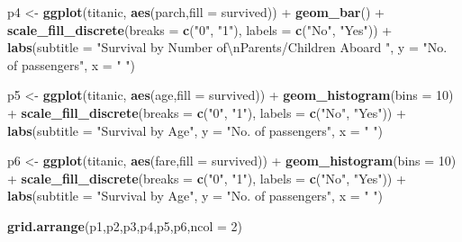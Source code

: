 \documentclass[12,]{article}
\newenvironment{Shaded}{\begin{snugshade}}{\end{snugshade}}
\newcommand{\KeywordTok}[1]{\textcolor[rgb]{0.13,0.29,0.53}{\textbf{{#1}}}}
\newcommand{\DataTypeTok}[1]{\textcolor[rgb]{0.13,0.29,0.53}{{#1}}}
\newcommand{\DecValTok}[1]{\textcolor[rgb]{0.00,0.00,0.81}{{#1}}}
\newcommand{\CharTok}[1]{\textcolor[rgb]{0.31,0.60,0.02}{{#1}}}
\newcommand{\StringTok}[1]{\textcolor[rgb]{0.31,0.60,0.02}{{#1}}}
\newcommand{\NormalTok}[1]{{#1}}
\begin{document}
\begin{Shaded}
\begin{Highlighting}[]
\NormalTok{p4 <-}\StringTok{ }\KeywordTok{ggplot}\NormalTok{(titanic, }\KeywordTok{aes}\NormalTok{(parch,}\DataTypeTok{fill =} \NormalTok{survived)) +}\StringTok{ }
\StringTok{    }\KeywordTok{geom_bar}\NormalTok{() +}\StringTok{ }\KeywordTok{scale_fill_discrete}\NormalTok{(}\DataTypeTok{breaks =} \KeywordTok{c}\NormalTok{(}\StringTok{"0"}\NormalTok{, }\StringTok{"1"}\NormalTok{), }\DataTypeTok{labels =} \KeywordTok{c}\NormalTok{(}\StringTok{"No"}\NormalTok{, }\StringTok{"Yes"}\NormalTok{)) +}\StringTok{ }
\StringTok{    }\KeywordTok{labs}\NormalTok{(}\DataTypeTok{subtitle =} \StringTok{"Survival by Number of}\CharTok{\textbackslash{}n}\StringTok{Parents/Children Aboard "}\NormalTok{, }
         \DataTypeTok{y =} \StringTok{"No. of passengers"}\NormalTok{, }\DataTypeTok{x =} \StringTok{" "}\NormalTok{)}

\NormalTok{p5 <-}\StringTok{ }\KeywordTok{ggplot}\NormalTok{(titanic, }\KeywordTok{aes}\NormalTok{(age,}\DataTypeTok{fill =} \NormalTok{survived)) +}\StringTok{ }\KeywordTok{geom_histogram}\NormalTok{(}\DataTypeTok{bins =} \DecValTok{10}\NormalTok{) +}
\StringTok{    }\KeywordTok{scale_fill_discrete}\NormalTok{(}\DataTypeTok{breaks =} \KeywordTok{c}\NormalTok{(}\StringTok{"0"}\NormalTok{, }\StringTok{"1"}\NormalTok{), }\DataTypeTok{labels =} \KeywordTok{c}\NormalTok{(}\StringTok{"No"}\NormalTok{, }\StringTok{"Yes"}\NormalTok{)) +}
\StringTok{    }\KeywordTok{labs}\NormalTok{(}\DataTypeTok{subtitle =} \StringTok{"Survival by Age"}\NormalTok{, }\DataTypeTok{y =} \StringTok{"No. of passengers"}\NormalTok{, }\DataTypeTok{x =} \StringTok{" "}\NormalTok{)}

\NormalTok{p6 <-}\StringTok{ }\KeywordTok{ggplot}\NormalTok{(titanic, }\KeywordTok{aes}\NormalTok{(fare,}\DataTypeTok{fill =} \NormalTok{survived)) +}\StringTok{ }\KeywordTok{geom_histogram}\NormalTok{(}\DataTypeTok{bins =} \DecValTok{10}\NormalTok{) +}
\StringTok{    }\KeywordTok{scale_fill_discrete}\NormalTok{(}\DataTypeTok{breaks =} \KeywordTok{c}\NormalTok{(}\StringTok{"0"}\NormalTok{, }\StringTok{"1"}\NormalTok{), }\DataTypeTok{labels =} \KeywordTok{c}\NormalTok{(}\StringTok{"No"}\NormalTok{, }\StringTok{"Yes"}\NormalTok{)) +}
\StringTok{    }\KeywordTok{labs}\NormalTok{(}\DataTypeTok{subtitle =} \StringTok{"Survival by Age"}\NormalTok{, }\DataTypeTok{y =} \StringTok{"No. of passengers"}\NormalTok{, }\DataTypeTok{x =} \StringTok{" "}\NormalTok{)}

\KeywordTok{grid.arrange}\NormalTok{(p1,p2,p3,p4,p5,p6,}\DataTypeTok{ncol =} \DecValTok{2}\NormalTok{)}
\end{Highlighting}
\end{Shaded}
\end{document}

